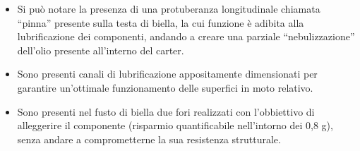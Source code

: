 \begin{itemize}
    \item Si può notare la presenza di una protuberanza longitudinale chiamata “pinna” presente sulla testa di biella, la cui funzione è adibita alla lubrificazione dei componenti, andando a creare una parziale “nebulizzazione” dell’olio presente all’interno del carter. 
    \item Sono presenti canali di lubrificazione appositamente dimensionati per garantire un’ottimale funzionamento delle superfici in moto relativo.
    \item Sono presenti nel fusto di biella due fori realizzati con l’obbiettivo di alleggerire il componente (risparmio quantificabile nell'intorno dei 0,8 g), senza andare a comprometterne la sua resistenza strutturale. 
\end{itemize}
